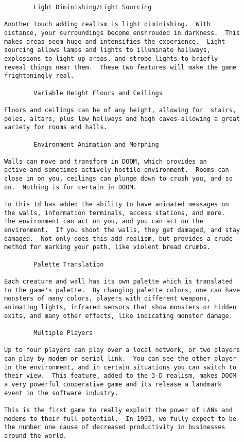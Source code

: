 \begin{verbatim}
        Light Diminishing/Light Sourcing

Another touch adding realism is light diminishing.  With
distance, your surroundings become enshrouded in darkness.  This
makes areas seem huge and intensifies the experience.  Light
sourcing allows lamps and lights to illuminate hallways,
explosions to light up areas, and strobe lights to briefly
reveal things near them.  These two features will make the game
frighteningly real.

        Variable Height Floors and Ceilings

Floors and ceilings can be of any height, allowing for  stairs,
poles, altars, plus low hallways and high caves-allowing a great
variety for rooms and halls.

        Environment Animation and Morphing

Walls can move and transform in DOOM, which provides an
active-and sometimes actively hostile-environment.  Rooms can
close in on you, ceilings can plunge down to crush you, and so
on.  Nothing is for certain in DOOM.

To this Id has added the ability to have animated messages on
the walls, information terminals, access stations, and more. 
The environment can act on you, and you can act on the
environment.  If you shoot the walls, they get damaged, and stay
damaged.  Not only does this add realism, but provides a crude
method for marking your path, like violent bread crumbs.

        Palette Translation

Each creature and wall has its own palette which is translated
to the game's palette.  By changing palette colors, one can have
monsters of many colors, players with different weapons,
animating lights, infrared sensors that show monsters or hidden
exits, and many other effects, like indicating monster damage.

        Multiple Players

Up to four players can play over a local network, or two players
can play by modem or serial link.  You can see the other player
in the environment, and in certain situations you can switch to
their view.  This feature, added to the 3-D realism, makes DOOM
a very powerful cooperative game and its release a landmark
event in the software industry.

This is the first game to really exploit the power of LANs and
modems to their full potential.  In 1993, we fully expect to be
the number one cause of decreased productivity in businesses
around the world.


\end{verbatim}
